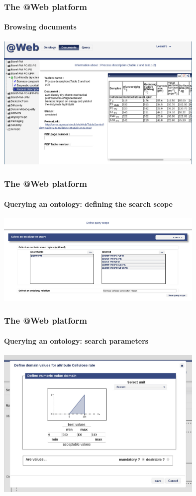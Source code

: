 \documentclass{beamer}
\begin{document}
\begin{frame}
  \frametitle{The \textbf{@Web} platform}
  \framesubtitle{Browsing documents}

  \begin{center}
    \includegraphics[width=10cm]{atweb-document.jpg}
  \end{center}
\end{frame}

\begin{frame}
  \frametitle{The \textbf{@Web} platform}
  \framesubtitle{Querying an ontology: defining the search scope}

  \begin{center}
    \includegraphics[width=10cm]{atweb-query-1.jpg}
  \end{center}
\end{frame}

\begin{frame}
  \frametitle{The \textbf{@Web} platform}
  \framesubtitle{Querying an ontology: search parameters}

  \begin{center}
    \includegraphics[width=10cm]{atweb-query-2.jpg}
  \end{center}
\end{frame}
\end{document}
